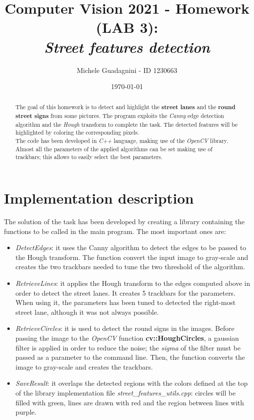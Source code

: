 \documentclass[11pt,a4paper]{article}
\author{Michele Guadagnini - ID 1230663}
\title{\textbf{Computer Vision 2021 - Homework (LAB 3): \\ \textit{Street features detection}}}
\date{\today}
\begin{document}
\maketitle

\vspace{20pt}
\begin{abstract}
	The goal of this homework is to detect and highlight the \textbf{street lanes} and the \textbf{round street signs} from some pictures. The program exploits the \textit{Canny} edge detection algorithm and the \textit{Hough} transform to complete the task. The detected features will be highlighted by coloring the corresponding pixels. \\
	The code has been developed in \textit{C++} language, making use of the \textit{OpenCV} library. Almost all the parameters of the applied algorithms can be set making use of trackbars; this allows to easily select the best parameters.
\end{abstract}

\section{Implementation description} %

The solution of the task has been developed by creating a library containing the functions to be called in the main program. The most important ones are:

\begin{itemize}
	\item \textit{DetectEdges}: it uses the Canny algorithm to detect the edges to be passed to the Hough transform. The function convert the input image to gray-scale and creates the two trackbars needed to tune the two threshold of the algorithm.
	
	\item \textit{RetrieveLines}: it applies the Hough transform to the edges computed above in order to detect the street lanes. It creates 5 trackbars for the parameters. When using it, the parameters has been tuned to detected the right-most street lane, although it was not always possible.
	
	\item \textit{RetrieveCircles}: it is used to detect the round signs in the images. Before passing the image to the \textit{OpenCV} function \textbf{cv::HoughCircles}, a gaussian filter is applied in order to reduce the noise; the \textit{sigma} of the filter must be passed as a parameter to the command line. Then, the function converts the image to gray-scale and creates the trackbars.
	
	\item \textit{SaveResult}: it overlaps the detected regions with the colors defined at the top of the library implementation file \textit{street\_features\_utils.cpp}: circles will be filled with green, lines are drawn with red and the region between lines with purple.
\end{itemize} 
\end{document}
